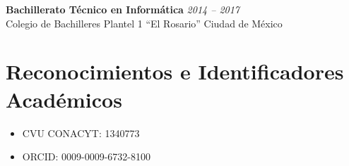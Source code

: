 \documentclass[11pt, a4paper]{article}
\begin{document}
\vspace{4pt}
\textbf{Bachillerato T\'ecnico en Inform\'atica} \hfill \textit{2014 -- 2017}\\
Colegio de Bachilleres Plantel 1 ``El Rosario'' \hfill Ciudad de M\'exico

\section{Reconocimientos e Identificadores Acad\'emicos}
\begin{itemize}[leftmargin=*, itemsep=2pt]
    \item CVU CONACYT: 1340773
    \item ORCID: 0009-0009-6732-8100
\end{itemize}
\end{document}
